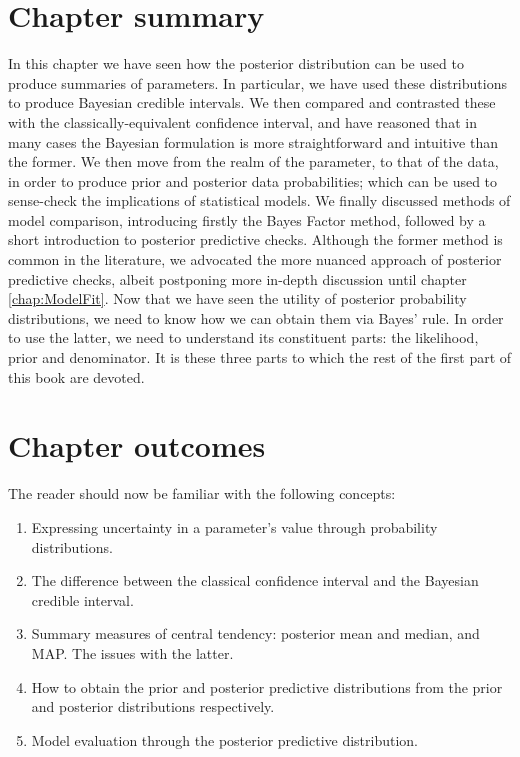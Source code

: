 \documentclass[11pt,fullpage]{book}
\begin{document}
\section{Chapter summary}
In this chapter we have seen how the posterior distribution can be used to produce summaries of parameters. In particular, we have used these distributions to produce Bayesian credible intervals. We then compared and contrasted these with the classically-equivalent confidence interval, and have reasoned that in many cases the Bayesian formulation is more straightforward and intuitive than the former. We then move from the realm of the parameter, to that of the data, in order to produce prior and posterior data probabilities; which can be used to sense-check the implications of statistical models. We finally discussed methods of model comparison, introducing firstly the Bayes Factor method, followed by a short introduction to posterior predictive checks. Although the former method is common in the literature, we advocated the more nuanced approach of posterior predictive checks, albeit postponing more in-depth discussion until chapter \ref{chap:ModelFit}. Now that we have seen the utility of posterior probability distributions, we need to know how we can obtain them via Bayes' rule. In order to use the latter, we need to understand its constituent parts: the likelihood, prior and denominator. It is these three parts to which the rest of the first part of this book are devoted.

\section{Chapter outcomes}
The reader should now be familiar with the following concepts:
\begin{enumerate}
\item Expressing uncertainty in a parameter's value through probability distributions.
\item The difference between the classical confidence interval and the Bayesian credible interval.
\item Summary measures of central tendency: posterior mean and median, and MAP. The issues with the latter.
\item How to obtain the prior and posterior predictive distributions from the prior and posterior distributions respectively.
\item Model evaluation through the posterior predictive distribution.
\end{enumerate}
\end{document}
